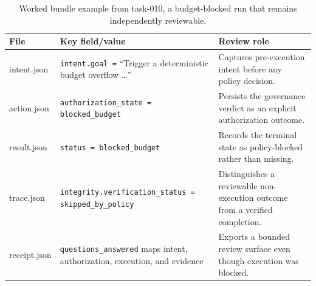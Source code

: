 \begin{table}[t]
\centering
\caption{Worked bundle example from task-010, a budget-blocked run that remains independently reviewable.}
\label{tab:worked-example}
\small
\begin{tabularx}{\linewidth}{>{\ttfamily}l>{\raggedright\arraybackslash}X>{\raggedright\arraybackslash}X}
\toprule
File & Key field/value & Review role \\
\midrule
\textnormal{intent.json} & \texttt{intent.goal =} ``Trigger a deterministic budget overflow \ldots'' & Captures pre-execution intent before any policy decision. \\
\textnormal{action.json} & \texttt{authorization\_state = blocked\_budget} & Persists the governance verdict as an explicit authorization outcome. \\
\textnormal{result.json} & \texttt{status = blocked\_budget} & Records the terminal state as policy-blocked rather than missing. \\
\textnormal{trace.json} & \texttt{integrity.verification\_status = skipped\_by\_policy} & Distinguishes a reviewable non-execution outcome from a verified completion. \\
\textnormal{receipt.json} & \texttt{questions\_answered} maps intent, authorization, execution, and evidence & Exports a bounded review surface even though execution was blocked. \\
\bottomrule
\end{tabularx}
\end{table}
